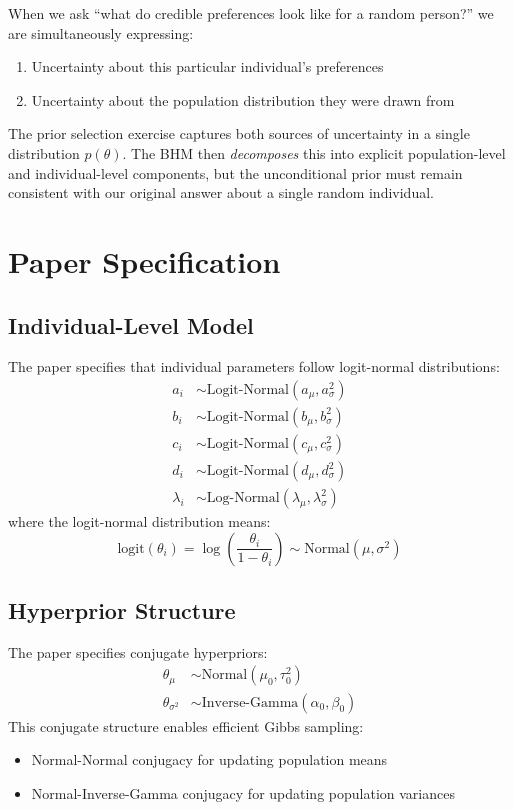 \documentclass[11pt]{article}
\begin{document}
When we ask ``what do credible preferences look like for a random person?'' we are simultaneously expressing:
\begin{enumerate}
  \item Uncertainty about this particular individual's preferences
  \item Uncertainty about the population distribution they were drawn from
\end{enumerate}

The prior selection exercise captures both sources of uncertainty in a single distribution $p(\theta)$. The BHM then \textit{decomposes} this into explicit population-level and individual-level components, but the unconditional prior must remain consistent with our original answer about a single random individual.

\section{Paper Specification}

\subsection{Individual-Level Model}

The paper specifies that individual parameters follow logit-normal distributions:
\begin{align}
  a_i &\sim \text{Logit-Normal}(a_\mu, a_\sigma^2) \\
  b_i &\sim \text{Logit-Normal}(b_\mu, b_\sigma^2) \\
  c_i &\sim \text{Logit-Normal}(c_\mu, c_\sigma^2) \\
  d_i &\sim \text{Logit-Normal}(d_\mu, d_\sigma^2) \\
  \lambda_i &\sim \text{Log-Normal}(\lambda_\mu, \lambda_\sigma^2)
\end{align}
where the logit-normal distribution means:
\[
  \text{logit}(\theta_i) = \log\left(\frac{\theta_i}{1-\theta_i}\right) \sim \text{Normal}(\mu, \sigma^2)
\]

\subsection{Hyperprior Structure}

The paper specifies conjugate hyperpriors:
\begin{align}
  \theta_\mu &\sim \text{Normal}(\mu_0, \tau_0^2) \\
  \theta_{\sigma^2} &\sim \text{Inverse-Gamma}(\alpha_0, \beta_0)
\end{align}
This conjugate structure enables efficient Gibbs sampling:
\begin{itemize}
  \item Normal-Normal conjugacy for updating population means
  \item Normal-Inverse-Gamma conjugacy for updating population variances
\end{itemize}
\end{document}
